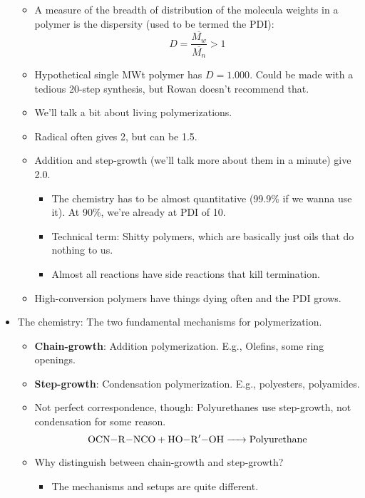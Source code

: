 \documentclass[../notes.tex]{subfiles}
\begin{document}
\begin{itemize}
\begin{itemize}
        \item A measure of the breadth of distribution of the molecula weights in a polymer is the dispersity (used to be termed the PDI):
        \begin{equation*}
            D = \frac{\overline{M_w}}{\overline{M_n}} > 1
        \end{equation*}
        \item Hypothetical single MWt polymer has $D=1.000$. Could be made with a tedious 20-step synthesis, but Rowan doesn't recommend that.
        \item We'll talk a bit about living polymerizations.
        \item Radical often gives 2, but can be 1.5.
        \item Addition and step-growth (we'll talk more about them in a minute) give 2.0.
        \begin{itemize}
            \item The chemistry has to be almost quantitative (99.9\% if we wanna use it). At 90\%, we're already at PDI of 10.
            \item Technical term: Shitty polymers, which are basically just oils that do nothing to us.
            \item Almost all reactions have side reactions that kill termination.
        \end{itemize}
        \item High-conversion polymers have things dying often and the PDI grows.
    \end{itemize}
    \item The chemistry: The two fundamental mechanisms for polymerization.
    \begin{itemize}
        \item \textbf{Chain-growth}: Addition polymerization. E.g., Olefins, some ring openings.
        \item \textbf{Step-growth}: Condensation polymerization. E.g., polyesters, polyamides.
        \item Not perfect correspondence, though: Polyurethanes use step-growth, not condensation for some reason.
        \begin{equation*}
            \ce{OCN-R-NCO + HO-R$'$-OH -> Polyurethane}
        \end{equation*}
        \item Why distinguish between chain-growth and step-growth?
        \begin{itemize}
            \item The mechanisms and setups are quite different.

\end{itemize}
\end{itemize}
\end{itemize}
\end{document}
